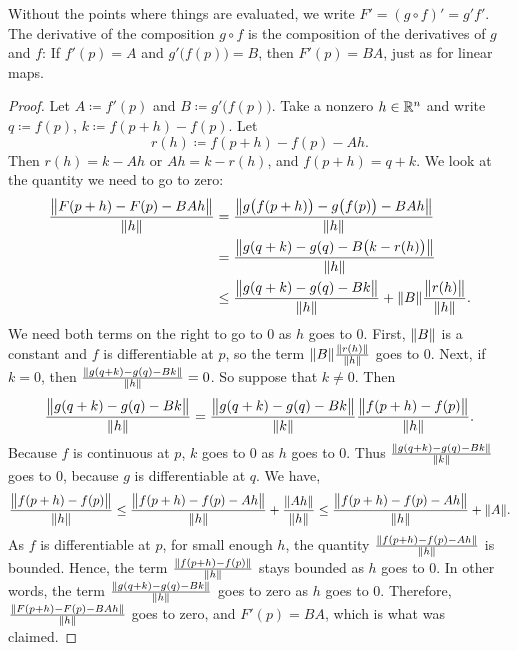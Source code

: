 Without the points where things are evaluated, we write
$F' = {(g \circ f)}' = g' f'$.
The derivative of the composition $g \circ f$
is the composition of the derivatives of $g$ and $f$:
If $f'(p) = A$ and $g'\bigl(f(p)\bigr) = B$, then $F'(p) = BA$,
just as for linear maps.

\begin{proof}
Let $A \coloneqq f'(p)$ and $B \coloneqq g'\bigl(f(p)\bigr)$.  Take a nonzero $h \in {\mathbb{R}}^n$
and write $q \coloneqq f(p)$, $k \coloneqq f(p+h)-f(p)$.  Let
\begin{equation*}
r(h) \coloneqq f(p+h)-f(p) - A h . %
\end{equation*}
Then $r(h) = k-Ah$ or $Ah = k-r(h)$, and $f(p+h) = q+k$.
We look at the quantity we need to go
to zero:
\begin{equation*}
\begin{split}
\frac{\bigl\lVert {F(p+h)-F(p) - BAh} \bigr\rVert}{\lVert {h} \rVert}
& =
\frac{\bigl\lVert {g\bigl(f(p+h)\bigr)-g\bigl(f(p)\bigr) - BAh} \bigr\rVert}{\lVert {h} \rVert}
\\
& =
\frac{\bigl\lVert {g(q+k)-g(q) - B\bigl(k-r(h)\bigr)} \bigr\rVert}{\lVert {h} \rVert}
\\
& \leq
\frac
{\bigl\lVert {g(q+k)-g(q) - Bk} \bigr\rVert}
{\lVert {h} \rVert}
+
\lVert {B} \rVert
\frac
{\bigl\lVert {r(h)} \bigr\rVert}
{\lVert {h} \rVert}
.
\end{split}
\end{equation*}
We need both terms on the right to go to 0
as $h$ goes to 0.
First, $\lVert {B} \rVert$ is a constant and $f$ is differentiable at $p$,
so
the term $\lVert {B} \rVert\frac{\lVert {r(h)} \rVert}{\lVert {h} \rVert}$ goes to 0.
Next,
if $k=0$, then
$\frac
{\lVert {g(q+k)-g(q) - Bk} \rVert}
{\lVert {h} \rVert} = 0$.
So suppose that $k \neq 0$.
Then
\begin{equation*}
\frac
{\bigl\lVert {g(q+k)-g(q) - Bk} \bigr\rVert}
{\lVert {h} \rVert}
 =
\frac
{\bigl\lVert {g(q+k)-g(q) - Bk} \bigr\rVert}
{\lVert {k} \rVert}
\frac
{\bigl\lVert {f(p+h)-f(p)} \bigr\rVert}
{\lVert {h} \rVert} .
\end{equation*}
Because $f$ is continuous at $p$,
$k$ goes to 0 as $h$ goes to 0.
Thus
$\frac
{\lVert {g(q+k)-g(q) - Bk} \rVert}
{\lVert {k} \rVert}$ goes to 0, because $g$ is differentiable at $q$.
We have,
\begin{equation*}
\frac
{\bigl\lVert {f(p+h)-f(p)} \bigr\rVert}
{\lVert {h} \rVert}
\leq
\frac
{\bigl\lVert {f(p+h)-f(p)-Ah} \bigr\rVert}
{\lVert {h} \rVert}
+
\frac
{\lVert {Ah} \rVert}
{\lVert {h} \rVert}
\leq
\frac
{\bigl\lVert {f(p+h)-f(p)-Ah} \bigr\rVert}
{\lVert {h} \rVert}
+
\lVert {A} \rVert .
\end{equation*}
As $f$ is differentiable at $p$,
for small enough $h$, the quantity
$\frac{\lVert {f(p+h)-f(p)-Ah} \rVert}{\lVert {h} \rVert}$ is bounded.  Hence, the
term
$
\frac
{\lVert {f(p+h)-f(p)} \rVert}
{\lVert {h} \rVert}
$
stays bounded as $h$ goes to 0.
In other words, the term 
$\frac
{\lVert {g(q+k)-g(q) - Bk} \rVert}
{\lVert {h} \rVert}$ goes to zero as $h$ goes to 0.
Therefore, 
$\frac{\lVert {F(p+h)-F(p) - BAh} \rVert}{\lVert {h} \rVert}$ goes to zero, and
$F'(p) = BA$, which is what was claimed.
\end{proof}


